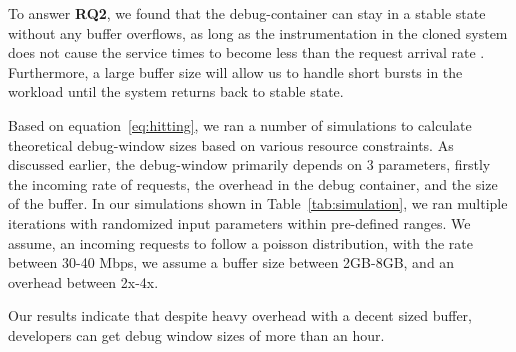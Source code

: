 \begin{tcolorbox}
		To answer \textbf{RQ2}, we found that the debug-container can stay in a stable state without any buffer overflows, as long as the instrumentation in the cloned system does not cause the service times to become less than the request arrival rate . Furthermore, a large buffer size will allow us to handle short bursts in the workload until the system returns back to stable state. 
\end{tcolorbox}


\iffalse
Based on equation~\ref{eq:hitting}, we ran a number of simulations to calculate theoretical debug-window sizes based on various resource constraints. 
As discussed earlier, the debug-window primarily depends on 3 parameters, firstly the incoming rate of requests, the overhead in the debug container, and the size of the buffer.
In our simulations shown in Table~\ref{tab:simulation}, we ran multiple iterations with randomized input parameters within pre-defined ranges. 
We assume, an incoming requests to follow a poisson distribution,  with the rate between 30-40 Mbps, we assume a buffer size between 2GB-8GB, and an overhead between 2x-4x. 

Our results indicate that despite heavy overhead with a decent sized buffer, developers can get debug window sizes of more than an hour. 
 
